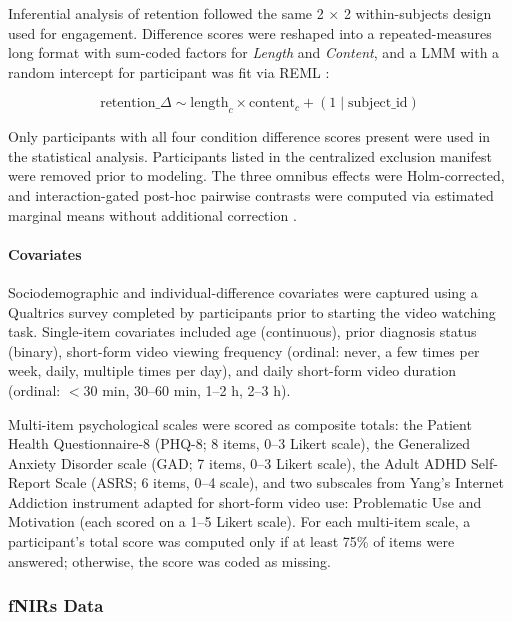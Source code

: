 \documentclass[10pt, twocolumn]{article}
\begin{document}
Inferential analysis of retention followed the same 2 $\times$ 2 within-subjects design used
for engagement. Difference scores were reshaped into a repeated-measures long format with
sum-coded factors for \textit{Length} and \textit{Content}, and a LMM with a random intercept
for participant was fit via REML \cite{Bates2014FittingLM}:

\begin{equation}
\text{retention\_$\Delta$} \sim \text{length}_c \times \text{content}_c + (1 \mid \text{subject\_id})
\end{equation}

Only participants with all four condition difference scores present were used in the statistical analysis. Participants listed in the centralized exclusion manifest were removed prior to modeling. The three omnibus effects were Holm-corrected, and interaction-gated post-hoc pairwise contrasts were computed via estimated marginal means without additional correction \cite{Holm1979ASS, emmeansR, Searle1980PopulationMM}.

\paragraph{Covariates}

Sociodemographic and individual-difference covariates were captured using a Qualtrics survey completed by participants prior to starting the video watching task. Single-item covariates included age (continuous), prior diagnosis status (binary), short-form video viewing frequency (ordinal: never, a few times per week, daily, multiple times per day), and daily short-form video duration (ordinal: $<$30 min, 30--60 min, 1--2 h, 2--3 h).

Multi-item psychological scales were scored as composite totals: the Patient Health
Questionnaire-8 (PHQ-8; 8 items, 0--3 Likert scale), the Generalized Anxiety Disorder scale (GAD; 7 items, 0--3 Likert scale), the Adult ADHD Self-Report Scale (ASRS; 6 items, 0--4 scale), and two subscales from Yang's Internet Addiction instrument adapted for short-form video use: Problematic Use and Motivation (each scored on a 1--5 Likert scale). For each multi-item scale, a participant's total score was computed only if at least 75\% of items were answered; otherwise, the score was coded as missing.

\subsubsection{fNIRs Data}
\end{document}
